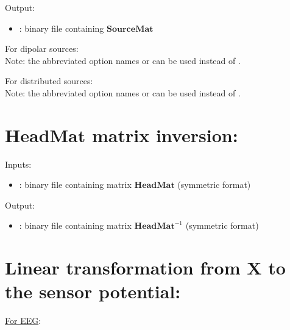 \noindent
Output:
\begin{itemize}
    \item {}: binary file containing $\mathbf{SourceMat}$
\end{itemize}

\medskip

\noindent
For dipolar sources:\\
\noindent
{}
\medskip
Note:  the abbreviated option names  or  can be used instead of .

\medskip

\noindent
For distributed sources:\\
\noindent
{}
\medskip
Note: the abbreviated option names   or   can be used instead of  .

\section{$\mathbf{HeadMat}$ matrix inversion:}
\label{sect: command invert HeadMat}

\noindent
Inputs:
\begin{itemize}
    \item {}: binary file containing matrix $\mathbf{HeadMat}$ (symmetric format)
\end{itemize}

\noindent
Output:
\begin{itemize}
    \item {}: binary file containing matrix $\mathbf{HeadMat}^{-1}$ (symmetric format)
\end{itemize}

\medskip

\noindent
{}

\section{Linear transformation from X to the sensor potential:}
\label{sect: command assemble sensors}

\checkItem \underline{For EEG}:\\

